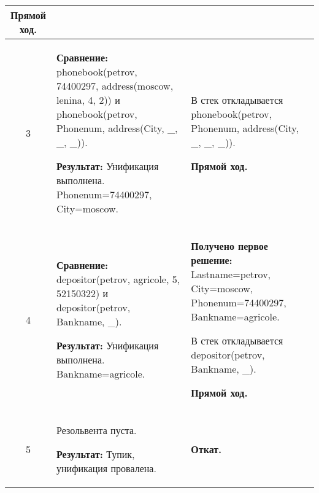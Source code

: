 \begin{longtable}{|c|p{}|p{}|}
    \textbf{Прямой ход.}
                       \\ \hline

    3
                       &
\textbf{Сравнение:} \newline
    phonebook(petrov, 74400297, address(moscow,    lenina,       4,  2))
    \newline и \newline
    phonebook(petrov, Phonenum, address(City, \_, \_, \_)).
    \newline

    \textbf{Результат:} \newline
    Унификация выполнена.\newline{}
    Phonenum=74400297, City=moscow.
                       &
    В стек откладывается\newline
    phonebook(petrov, Phonenum, address(City, \_, \_, \_)).
    \newline

    \textbf{Прямой ход.}
                       \\ \hline

    4
                       &
\textbf{Сравнение:} \newline
    depositor(petrov, agricole, 5, 52150322)
    \newline и \newline
    depositor(petrov, Bankname, \_).
    \newline

    \textbf{Результат:} \newline
    Унификация выполнена.\newline{}
    Bankname=agricole.
                       &
    \textbf{Получено первое решение:}\newline
    Lastname=petrov, City=moscow, Phonenum=74400297, Bankname=agricole.
    \newline

    В стек откладывается\newline
    depositor(petrov, Bankname, \_).
    \newline

    \textbf{Прямой ход.}
                       \\ \hline

    5
                       &
    Резольвента пуста.
    \newline

    \textbf{Результат:} \newline
    Тупик, унификация провалена.
                       &
    \textbf{Откат.}
    \newline


\end{longtable}
